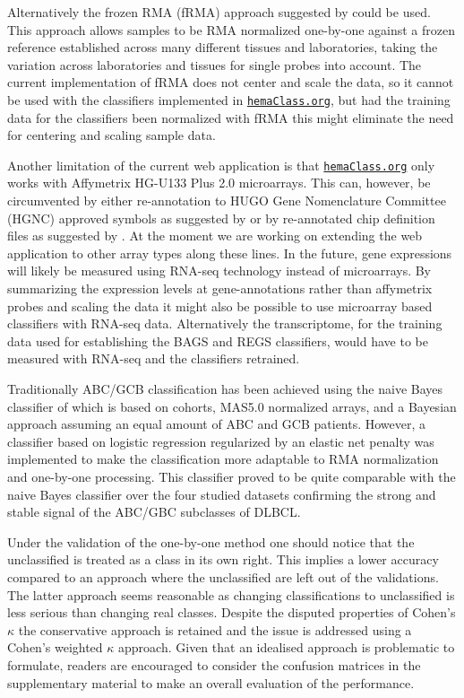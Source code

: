 \documentclass[10pt,letterpaper]{article}
\newcommand{\hemaClass}{\href{http://hemaClass.org}{\texttt{hemaClass.org}}}
\begin{document}
Alternatively the frozen RMA (fRMA) approach suggested by \mbox{\cite{McCall2010}} could be used. This approach allows samples to be RMA normalized one-by-one against a frozen reference established across many different tissues and laboratories, taking the variation across laboratories and tissues for single probes into account. The current implementation of fRMA does not center and scale the data, so it cannot be used with the classifiers implemented in \hemaClass{}, but had the training data for the classifiers been normalized with fRMA this might eliminate the need for centering and scaling sample data.

Another limitation of the current web application is that \hemaClass{} only works with Affymetrix HG-U133 Plus 2.0 microarrays. This can, however, be circumvented by either re-annotation to HUGO Gene Nomenclature Committee (HGNC) approved symbols as suggested by \cite{Care2013} or by re-annotated chip definition files as suggested by \cite{Dai2005}. At the moment we are working on extending the web application to other array types along these lines. In the future, gene expressions will likely be measured using RNA-seq technology instead of microarrays. By summarizing the expression levels at gene-annotations rather than affymetrix probes and scaling the data it might also be possible to use microarray based classifiers with RNA-seq data. Alternatively the transcriptome, for the training data used for establishing the BAGS and REGS classifiers, would have to be measured with RNA-seq and the classifiers retrained.

Traditionally ABC/GCB classification has been achieved using the naive Bayes classifier of \cite{Wright2003} which is based on cohorts, MAS5.0 normalized arrays, and a Bayesian approach assuming an equal amount of ABC and GCB patients.
However, a classifier based on logistic regression regularized by an elastic net penalty was implemented to make the classification more adaptable to RMA normalization and one-by-one processing.
This classifier proved to be quite comparable with the naive Bayes classifier over the four studied datasets confirming the strong and stable signal of the ABC/GBC subclasses of DLBCL.

Under the validation of the one-by-one method one should notice that the unclassified is treated as a class in its own right.
This implies a lower accuracy compared to an approach where the unclassified are left out of the validations.
The latter approach seems reasonable as changing classifications to unclassified is less serious than changing real classes.
Despite the disputed properties of Cohen's $\kappa$ the conservative approach is retained and the issue is addressed using a Cohen's weighted $\kappa$ approach.
Given that an idealised approach is problematic to formulate, readers are encouraged to consider the confusion matrices in the supplementary material to make an overall evaluation of the performance.
\end{document}
